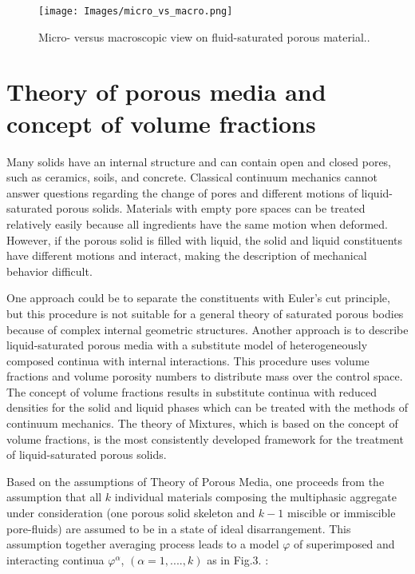 \documentclass[12pt]{article}
\begin{document}
\begin{figure}[H]
	\centering
	\texttt{[image: Images/micro\_vs\_macro.png]}
	\caption{Micro- versus macroscopic view on fluid-saturated porous material.\cite{Ehlers2002}.}
	\label{fig:micro_vs_macro}
\end{figure}

\section{\huge{Theory of porous media and concept of volume fractions}}

Many solids have an internal structure and can contain open and closed pores, such as ceramics, soils, and concrete. Classical continuum mechanics cannot answer questions regarding the change of pores and different motions of liquid-saturated porous solids. Materials with empty pore spaces can be treated relatively easily because all ingredients have the same motion when deformed. However, if the porous solid is filled with liquid, the solid and liquid constituents have different motions and interact, making the description of mechanical behavior difficult. 

One approach could be to separate the constituents with Euler's cut principle, but this procedure is not suitable for a general theory of saturated porous bodies because of complex internal geometric structures. Another approach is to describe liquid-saturated porous media with a substitute model of heterogeneously composed continua with internal interactions. This procedure uses volume fractions and volume porosity numbers to distribute mass over the control space. The concept of volume fractions results in substitute continua with reduced densities for the solid and liquid phases which can be treated with the methods of continuum mechanics. The theory of Mixtures, which is based on the concept of volume fractions, is the most consistently developed framework for the treatment of liquid-saturated porous solids. \cite{3}

Based on the assumptions of Theory of Porous Media, one  proceeds from the assumption that all \(k\) individual materials composing the  multiphasic aggregate under consideration (one porous solid skeleton and  \(k- 1\) miscible or immiscible pore-fluids) are assumed to be in a state of ideal disarrangement. This assumption together averaging process leads to a model \(\varphi\) of superimposed and interacting continua \(\varphi^\alpha\), \((\alpha = 1,....,k)\) as in Fig.3. :
\end{document}

